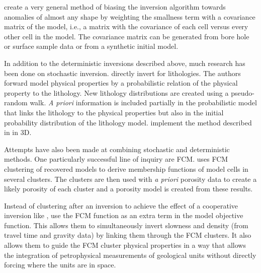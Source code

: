 \cite{chasseriau20033d} create a very general method of biasing the inversion algorithm towards anomalies of almost any shape by weighting the smallness term with a covariance matrix of the model, i.e., a matrix with the covariance of each cell versus every other cell in the model. The covariance matrix can be generated from bore hole or surface sample data or from a synthetic initial model.

In addition to the deterministic inversions described above, much research has been done on stochastic inversion. \cite{bosch2001lithologic} directly invert for lithologies. The authors forward model physical properties by a probabilistic relation of the physical property to the lithology. New lithology distributions are created using a pseudo-random walk. \emph{A priori} information is included partially in the probabilistic model that links the lithology to the physical properties but also in the initial probability distribution of the lithology model. \cite{guillen2008geological} implement the method described in \cite{bosch2001lithologic} in 3D. 


Attempts have also been made at combining stochastic and deterministic methods. One particularly successful line of inquiry are \ac{FCM}. \cite{paasche2006integration} uses FCM clustering of recovered models to derive membership functions of model cells in several clusters. The clusters are then used with \emph{a priori} porosity data to create a likely porosity of each cluster and a porosity model is created from these results. 

Instead of clustering after an inversion to achieve the effect of a cooperative inversion like \cite{paasche2006integration}, \cite{sun2015multidomain} use the FCM function as an extra term in the model objective function. This allows them to simultaneously invert slowness and density (from travel time and gravity data) by linking them through the FCM clusters. It also allows them to guide the FCM cluster physical properties in a way that allows the integration of petrophysical measurements of geological units without directly forcing where the units are in space.


